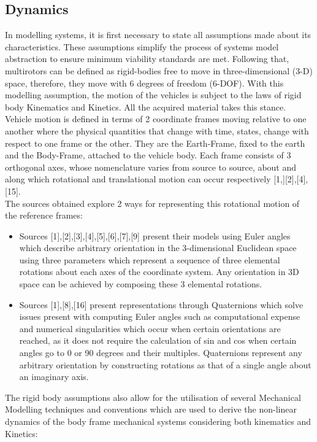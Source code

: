\documentclass[12pt,a4paper,twoside]{report}
\begin{document}
			\subsection{Dynamics}
				In modelling systems, it is first necessary to state all assumptions made about its characteristics. These assumptions simplify the process of systems model abstraction to ensure minimum viability standards are met. Following that, multirotors can be defined as rigid-bodies free to move in three-dimensional (3-D) space, therefore, they move with 6 degrees of freedom (6-DOF). With this modelling assumption, the motion of the vehicles is subject to the laws of rigid body Kinematics and Kinetics. All the acquired material takes this stance. 
				\\
				Vehicle motion is defined in terms of 2 coordinate frames moving relative to one another where the physical quantities that change with time, states, change with respect to one frame or the other. They are the Earth-Frame, fixed to the earth and the Body-Frame, attached to the vehicle body. Each frame consists of 3 orthogonal axes, whose nomenclature varies from source to source, about and along which rotational and translational motion can occur respectively [1,][2],[4],[15]. 
				\\
				The sources obtained explore 2 ways for representing this rotational motion of the reference frames:
				
				\begin{itemize}
					\item 
						Sources [1],[2],[3],[4],[5],[6],[7],[9] present their models using Euler angles which describe arbitrary orientation in the 3-dimensional Euclidean space using three parameters which represent a sequence of three elemental rotations about each axes of the coordinate system. Any orientation in 3D space can be achieved by composing these 3 elemental rotations.
					\item
						Sources [1],[8],[16] present representations through Quaternions which solve issues present with computing Euler angles such as computational expense and numerical singularities which occur when certain orientations are reached, as it does not require the calculation of sin and cos when certain angles go to 0 or 90 degrees and their multiples. Quaternions represent any arbitrary orientation by constructing rotations as that of a single angle about an imaginary axis. 
				\end{itemize}
				\space
				The rigid body assumptions also allow for the utilisation of several Mechanical Modelling techniques and conventions which are used to derive the non-linear dynamics of the body frame mechanical systems considering both kinematics and Kinetics:
				
\end{document}
